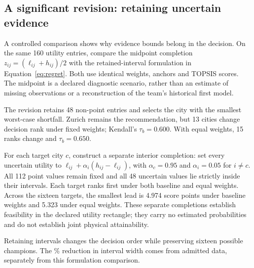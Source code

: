\subsection{A significant revision: retaining uncertain evidence}
A controlled comparison shows why evidence bounds belong in the decision.
On the same 160 utility entries, compare the midpoint completion $z_{ij}=(\ell_{ij}+h_{ij})/2$ with the retained-interval formulation in Equation~\ref{eq:regret}. Both use identical weights, anchors and TOPSIS scores. The midpoint is a declared diagnostic scenario, rather than an estimate of missing observations or a reconstruction of the team's historical first model.

The revision retains 48 non-point entries and selects the city with the smallest worst-case shortfall. Zurich remains the recommendation, but 13 cities change decision rank under fixed weights; Kendall's $\tau_b=0.600$. With equal weights, 15 ranks change and $\tau_b=0.650$.

For each target city $c$, construct a separate interior completion: set every uncertain utility to $\ell_{ij}+\alpha_i(h_{ij}-\ell_{ij})$, with $\alpha_c=0.95$ and $\alpha_i=0.05$ for $i\ne c$. All 112 point values remain fixed and all 48 uncertain values lie strictly inside their intervals. Each target ranks first under both baseline and equal weights. Across the sixteen targets, the smallest lead is 4.974 score points under baseline weights and 5.323 under equal weights. These separate completions establish feasibility in the declared utility rectangle; they carry no estimated probabilities and do not establish joint physical attainability.

Retaining intervals changes the decision order while preserving sixteen possible champions. The \TotalWidthReduction\% reduction in interval width comes from admitted data, separately from this formulation comparison.
